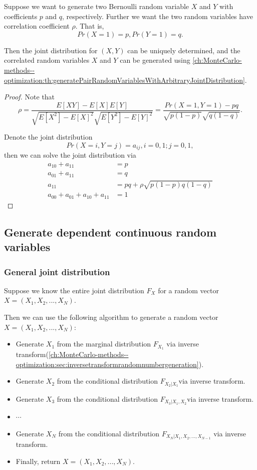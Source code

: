\begin{refsection}
\begin{lemma}
Suppose we want to generate two Bernoulli random variable $X$ and $Y$ with coefficients $p$ and $q$, respectively. Further we want the two random variables have correlation coefficient $\rho$. That is,
$$Pr(X=1) = p, Pr(Y=1) = q.$$

Then the joint distribution for $(X,Y)$ can be uniquely determined, and the correlated random variables $X$ and $Y$ can be generated using \autoref{ch:MonteCarlo-methods--optimization:th:generatePairRandomVariablesWithArbitraryJointDistribution}.
\end{lemma}
\begin{proof}
Note that $$\rho = \frac{E[XY] - E[X]E[Y]}{\sqrt{E[X^2]-E[X]^2}\sqrt{E[Y^2]-E[Y]^2}} = \frac{Pr(X=1,Y=1)-pq}{\sqrt{p(1-p)}\sqrt{q(1-q)}}.$$

Denote the joint distribution $$Pr(X=i,Y=j) = a_{ij},i=0,1;j=0,1,$$
then we can solve the joint distribution via	
\begin{align*}
a_{10} + a_{11} &= p\\
a_{01} + a_{11} &= q\\
a_{11} &= pq + \rho \sqrt{p(1-p)q(1-q)} \\
a_{00} + a_{01} + a_{10} + a_{11} &= 1
\end{align*}
\end{proof}


\subsection{Generate dependent continuous random variables}

\subsubsection{General joint distribution}
\begin{lemma}
Suppose we know the entire joint distribution $F_X$ for a random vector $X=(X_1,X_2,...,X_N)$. 

Then we can use the following algorithm to generate a random vector $X=(X_1,X_2,...,X_N)$:
\begin{itemize}
	\item Generate $X_1$ from the marginal distribution $F_{X_1}$ via inverse transform(\autoref{ch:MonteCarlo-methods--optimization:sec:inversetransformrandomnumbergeneration}).
	\item Generate $X_2$ from the conditional distribution $F_{X_2|X_1}$via inverse transform.
	\item Generate $X_3$ from the conditional distribution $F_{X_3|X_1,X_2}$via inverse transform.
	\item $\cdots$
	\item Generate $X_N$ from the conditional distribution $F_{X_N|X_1,X_2,...,X_{N-1}}$ via inverse transform.
	\item Finally,  return $X=(X_1,X_2,...,X_N)$.
\end{itemize}
\end{lemma}


\end{refsection}
